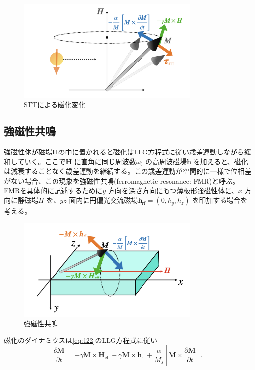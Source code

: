 \documentclass[dvipdfmx,11pt]{jsreport}
\numberwithin{equation}{chapter}
\numberwithin{table}{chapter}
\begin{document}
\begin{figure}[H]
	\centering
	\includegraphics[width=0.8\textwidth]{fig/fig.009.jpeg}
	\caption{STTによる磁化変化}
	\label{fig:fig-fig-009-jpeg}
\end{figure}

\subsection{強磁性共鳴}
強磁性体が磁場$\bm{H}$の中に置かれると磁化はLLG方程式に従い歳差運動しながら緩和していく。ここで$\bm{H}$ に直角に同じ周波数$\omega_0$ の高周波磁場$\bm{h}$ を加えると、磁化は減衰することなく歳差運動を継続する。この歳差運動が空間的に一様で位相差がない場合、この現象を強磁性共鳴(ferromagnetic resonance: FMR)と呼ぶ。FMRを具体的に記述するために$y$ 方向を深さ方向にもつ薄板形強磁性体に、$x$ 方向に静磁場$H$ を、$yz$ 面内に円偏光交流磁場$\bm{h}_\text{rf} =(0,h_y,h_z)$ を印加する場合を考える。
\begin{figure}[H]
	\centering
	\includegraphics[width=0.8\textwidth]{fig/fig.010}
	\caption{強磁性共鳴}
	\label{fig:fig-fig-010}
\end{figure}
磁化のダイナミクスは\eqref{eq:122}のLLG方程式に従い
\begin{equation}
\label{eq:130}
	\frac{\partial \bm{M}}{\partial t} =-\gamma\bm{M}\times \bm{H}_\text{eff}-\gamma \bm{M}\times \bm{h}_\text{rf} +\frac{\alpha}{M_s}\left[ \bm{M}\times \frac{\partial \bm{M}}{\partial t}  \right] 
.\end{equation}
\end{document}
